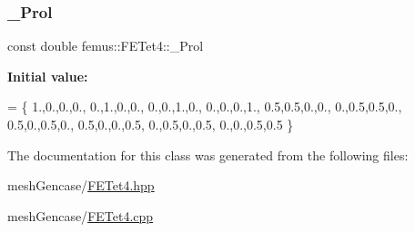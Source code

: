 \subsubsection{\texorpdfstring{\+\_\+\+Prol}{\_Prol}}
{\footnotesize\ttfamily const double femus\+::\+F\+E\+Tet4\+::\+\_\+\+Prol\hspace{0.3cm}{\ttfamily [static]}}

{\bfseries Initial value\+:}
\begin{DoxyCode}
= \{ 
   1.,0.,0.,0.,
   0.,1.,0.,0.,
   0.,0.,1.,0.,
   0.,0.,0.,1.,
   0.5,0.5,0.,0.,
      0.,0.5,0.5,0.,
   0.5,0.,0.5,0.,
   0.5,0.,0.,0.5,
    0.,0.5,0.,0.5,
        0.,0.,0.5,0.5
   \}
\end{DoxyCode}


The documentation for this class was generated from the following files\+:\begin{DoxyCompactItemize}
\item 
mesh\+Gencase/\mbox{\hyperlink{_f_e_tet4_8hpp}{F\+E\+Tet4.\+hpp}}\item 
mesh\+Gencase/\mbox{\hyperlink{_f_e_tet4_8cpp}{F\+E\+Tet4.\+cpp}}\end{DoxyCompactItemize}
